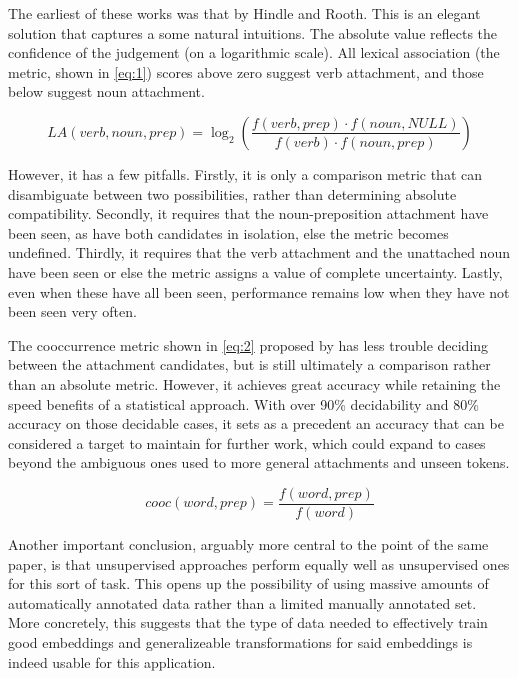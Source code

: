 \documentclass[a4paper, 12pt]{scrartcl}
\begin{document}
The earliest of these works was that by Hindle and Rooth. This is an elegant solution that captures a some natural intuitions. The absolute value reflects the confidence of the judgement (on a logarithmic scale). All lexical association (the metric, shown in \ref{eq:1}) scores above zero suggest verb attachment, and those below suggest noun attachment.

\begin{equation} \label{eq:1}
	LA(verb, noun, prep) = \log_{2} \left( \frac{f(verb, prep) \cdot f(noun, NULL)}{f(verb) \cdot f(noun, prep)} \right)
\end{equation}

However, it has a few pitfalls. Firstly, it is only a comparison metric that can disambiguate between two possibilities, rather than determining absolute compatibility. Secondly, it requires that the noun-preposition attachment have been seen, as have both candidates in isolation, else the metric becomes undefined. Thirdly, it requires that the verb attachment and the unattached noun have been seen or else the metric assigns a value of complete uncertainty. Lastly, even when these have all been seen, performance remains low when they have not been seen very often.

The cooccurrence metric shown in \ref{eq:2} proposed by \cite{Volk} has less trouble deciding between the attachment candidates, but is still ultimately a comparison rather than an absolute metric. However, it achieves great accuracy while retaining the speed benefits of a statistical approach. With over 90\% decidability and 80\% accuracy on those decidable cases, it sets as a precedent an accuracy that can be considered a target to maintain for further work, which could expand to cases beyond the ambiguous ones used to more general attachments and unseen tokens.

\begin{equation} \label{eq:2}
	cooc(word, prep) = \frac{f(word, prep)}{f(word)}
\end{equation}

Another important conclusion, arguably more central to the point of the same paper, is that unsupervised approaches perform equally well as unsupervised ones for this sort of task. This opens up the possibility of using massive amounts of automatically annotated data rather than a limited manually annotated set. More concretely, this suggests that the type of data needed to effectively train good embeddings and generalizeable transformations for said embeddings is indeed usable for this application.
\end{document}
